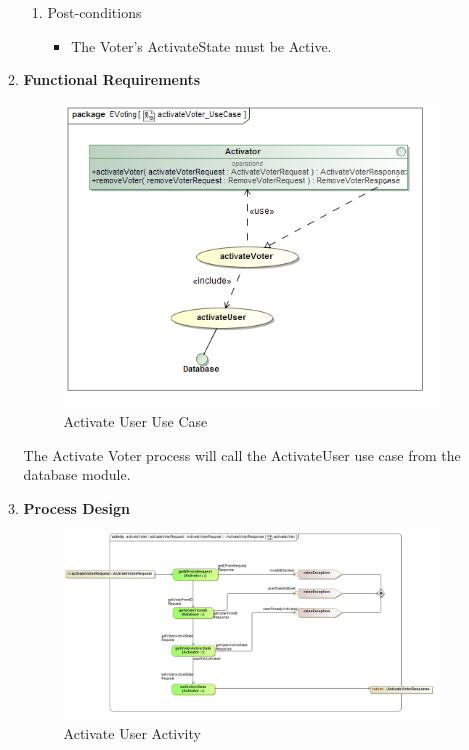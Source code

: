 \begin{enumerate}
\begin{enumerate}
\begin{enumerate}
					\item Post-conditions
					\begin{itemize}
						\item The Voter's ActivateState must be Active.
					\end{itemize}
				\end{enumerate}
			
			\item \textbf{Functional Requirements}
				\begin{figure}[H]
					\centering
					\includegraphics[width=0.75\linewidth]{../Images/Activator/UseCase/activateVoter_UseCase.jpg}
					\caption{Activate User Use Case}
				\end{figure}
				
				The Activate Voter process will call the ActivateUser use case from the database module.
				\newline
			
			\item \textbf{Process Design}
				\begin{figure}[H]
					\centering
					\includegraphics[width=0.75\linewidth]{../Images/Activator/Activity/activateVoter.jpg}
					\caption{Activate User Activity}
				\end{figure}
				

\end{enumerate}
\end{enumerate}
